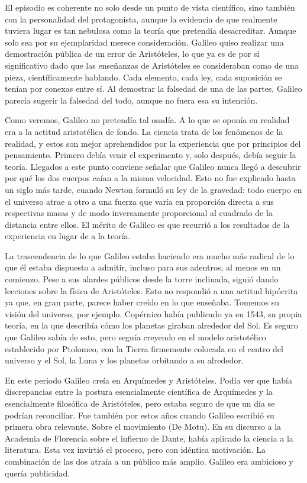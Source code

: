 \documentclass[letterpaper, 10pt, journal]{IEEEtran}
\begin{document}
El episodio es coherente no solo desde un punto de vista científico, sino también con la personalidad del protagonista, aunque la evidencia de que realmente tuviera lugar es tan nebulosa como la teoría que pretendía desacreditar. Aunque solo sea por su ejemplaridad merece consideración. Galileo quiso realizar una demostración pública de un error de Aristóteles, lo que ya es de por sí significativo dado que las enseñanzas de Aristóteles se consideraban como de una pieza, científicamente hablando. Cada elemento, cada ley, cada suposición se tenían por conexas entre sí. Al demostrar la falsedad de una de las partes, Galileo parecía sugerir la falsedad del todo, aunque no fuera esa su intención.

Como veremos, Galileo no pretendía tal osadía. A lo que se oponía en realidad era a la actitud aristotélica de fondo. La ciencia trata de los fenómenos de la realidad, y estos son mejor aprehendidos por la experiencia que por principios del pensamiento. Primero debía venir el experimento y, solo después, debía seguir la teoría. Llegados a este punto conviene señalar que Galileo nunca llegó a descubrir por qué los dos cuerpos caían a la misma velocidad. Esto no fue explicado hasta un siglo más tarde, cuando Newton formuló su ley de la gravedad: todo cuerpo en el universo atrae a otro a una fuerza que varía en proporción directa a sus respectivas masas y de modo inversamente proporcional al cuadrado de la distancia entre ellos. El mérito de Galileo es que recurrió a los resultados de la experiencia en lugar de a la teoría.

La trascendencia de lo que Galileo estaba haciendo era mucho más radical de lo que él estaba dispuesto a admitir, incluso para sus adentros, al menos en un comienzo. Pese a sus alardes públicos desde la torre inclinada, siguió dando lecciones sobre la física de Aristóteles. Esto no respondió a una actitud hipócrita ya que, en gran parte, parece haber creído en lo que enseñaba. Tomemos su visión del universo, por ejemplo. Copérnico había publicado ya en 1543, su propia teoría, en la que describía cómo los planetas giraban alrededor del Sol. Es seguro que Galileo sabía de esto, pero seguía creyendo en el modelo aristotélico establecido por Ptolomeo, con la Tierra firmemente colocada en el centro del universo y el Sol, la Luna y los planetas orbitando a su alrededor.

En este periodo Galileo creía en Arquímedes y Aristóteles. Podía ver que había discrepancias entre la postura esencialmente científica de Arquímedes y la esencialmente filosófica de Aristóteles, pero estaba seguro de que un día se podrían reconciliar. Fue también por estos años cuando Galileo escribió su primera obra relevante, Sobre el movimiento (De Motu). En su discurso a la Academia de Florencia sobre el infierno de Dante, había aplicado la ciencia a la literatura. Esta vez invirtió el proceso, pero con idéntica motivación. La combinación de las dos atraía a un público más amplio. Galileo era ambicioso y quería publicidad.
\end{document}
